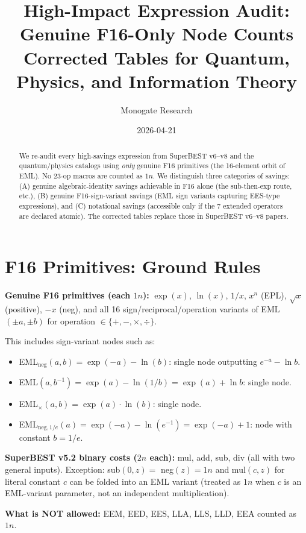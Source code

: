\documentclass[11pt]{article}
\title{High-Impact Expression Audit: Genuine F16-Only Node Counts\\
Corrected Tables for Quantum, Physics, and Information Theory}
\author{Monogate Research}
\date{2026-04-21}
\begin{document}
\maketitle

\begin{abstract}
We re-audit every high-savings expression from SuperBEST v6--v8 and the quantum/physics
catalogs using \emph{only} genuine F16 primitives (the 16-element orbit of EML).
No 23-op macros are counted as $1n$.
We distinguish three categories of savings:
(A) genuine algebraic-identity savings achievable in F16 alone (the sub-then-exp route, etc.),
(B) genuine F16-sign-variant savings (EML sign variants capturing EES-type expressions),
and (C) notational savings (accessible only if the 7 extended operators are declared atomic).
The corrected tables replace those in SuperBEST v6--v8 papers.
\end{abstract}

\section{F16 Primitives: Ground Rules}

\textbf{Genuine F16 primitives (each $1n$):}
$\exp(x)$, $\ln(x)$, $1/x$, $x^n$ (EPL), $\sqrt{x}$ (positive), $-x$ (neg),
and all 16 sign/reciprocal/operation variants of EML$(\pm a, \pm b)$
for operation $\in\{+,-,\times,\div\}$.

This includes sign-variant nodes such as:
\begin{itemize}
  \item EML$_{\mathrm{neg}}(a,b)=\exp(-a)-\ln(b)$: single node outputting $e^{-a}-\ln b$.
  \item EML$(a,b^{-1})=\exp(a)-\ln(1/b)=\exp(a)+\ln b$: single node.
  \item EML$_{\times}(a,b)=\exp(a)\cdot\ln(b)$: single node.
  \item EML$_{\mathrm{neg},1/e}(a)=\exp(-a)-\ln(e^{-1})=\exp(-a)+1$: node with constant $b=1/e$.
\end{itemize}

\textbf{SuperBEST v5.2 binary costs ($2n$ each):} mul, add, sub, div (all with two general inputs).
Exception: sub$(0,z)=$ neg$(z)=1n$ and mul$(c,z)$ for literal constant $c$ can be folded
into an EML variant (treated as $1n$ when $c$ is an EML-variant parameter, not an independent multiplication).

\textbf{What is NOT allowed:} EEM, EED, EES, LLA, LLS, LLD, EEA counted as $1n$.
\end{document}
